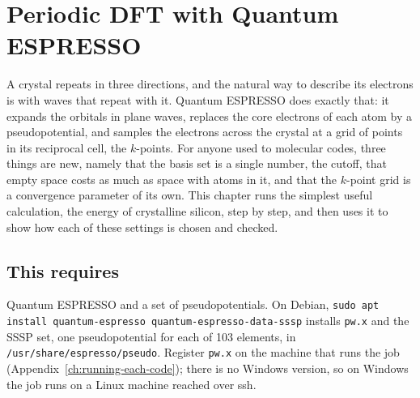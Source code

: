 \chapter{Periodic DFT with Quantum ESPRESSO}
\label{ch:qe-settings}

A crystal repeats in three directions, and the natural way to describe its electrons is with waves that repeat with it. Quantum ESPRESSO does exactly that: it expands the orbitals in plane waves, replaces the core electrons of each atom by a pseudopotential, and samples the electrons across the crystal at a grid of points in its reciprocal cell, the $k$-points. For anyone used to molecular codes, three things are new, namely that the basis set is a single number, the cutoff, that empty space costs as much as space with atoms in it, and that the $k$-point grid is a convergence parameter of its own. This chapter runs the simplest useful calculation, the energy of crystalline silicon, step by step, and then uses it to show how each of these settings is chosen and checked.

\section*{This requires}
Quantum ESPRESSO and a set of pseudopotentials. On Debian, \texttt{sudo apt install quantum-espresso quantum-espresso-data-sssp} installs \texttt{pw.x} and the SSSP set, one pseudopotential for each of 103 elements, in \texttt{/usr/share/espresso/pseudo}. Register \texttt{pw.x} on the machine that runs the job (Appendix~\ref{ch:running-each-code}); there is no Windows version, so on Windows the job runs on a Linux machine reached over ssh.

